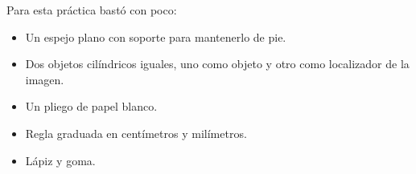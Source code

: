 Para esta práctica bastó con poco:
\begin{itemize}
\item Un espejo plano con soporte para mantenerlo de pie.
\item Dos objetos cilíndricos iguales, uno como objeto y otro como localizador de la imagen.
\item Un pliego de papel blanco.
\item Regla graduada en centímetros y milímetros.
\item Lápiz y goma.
\end{itemize}
